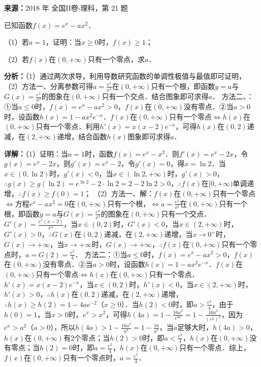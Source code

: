 \begin{question}[points=12]
\textbf{来源：}2018 年 全国II卷-理科，第 21 题\par
已知函数$f(x)=e^x-ax^2$．

（1）若$a=1$，证明：当$x\ge 0$时，$f(x)\ge 1$；

（2）若$f(x)$在$(0,+\infty)$只有一个零点，求$a$．
\begin{solution}

\textbf{分析：}（1）通过两次求导，利用导数研究函数的单调性极值与最值即可证明，
（2）方法一、分离参数可得$a=\frac{e^x}{x^2}$在$(0,+\infty)$只有一个根，即函数$y=a$与$G(x)=\frac{e^x}{x^2}$的图象在$(0,+\infty)$只有一个交点．结合图象即可求得$a$．
方法二、：①当$a\le 0$时，$f(x)=e^x-ax^2>0$，$f(x)$在$(0,+\infty)$没有零点．②当$a>0$时，设函数$h(x)=1-ax^2e^{-x}$．$f(x)$在$(0,+\infty)$只有一个零点$\Leftrightarrow h(x)$在$(0,+\infty)$只有一个零点．利用$h'(x)=x(x-2)e^{-x}$，可得$h(x)$在$(0,2)$递减，在$(2,+\infty)$递增，结合函数$h(x)$图象即可求得$a$．

\textbf{详解：}（1）证明：当$a=1$时，函数$f(x)=e^x-x^2$．则$f'(x)=e^x-2x$，令$g(x)=e^x-2x$，则$g'(x)=e^x-2$，令$g'(x)=0$，得$x=\ln2$．当$x\in(0,\ln2)$时，$g'(x)<0$，当$x\in(\ln2,+\infty)$时，$g'(x)>0$，$\therefore g(x)\ge g(\ln2)=e^{\ln2}-2\cdot\ln2=2-2\ln2>0$，$\therefore f(x)$在$[0,+\infty)$单调递增，$\therefore f(x)\ge f(0)=1$；
（2）方法一、解：$f(x)$在$(0,+\infty)$只有一个零点$\Leftrightarrow$方程$e^x-ax^2=0$在$(0,+\infty)$只有一个根，$\Leftrightarrow a=\frac{e^x}{x^2}$在$(0,+\infty)$只有一个根，即函数$y=a$与$G(x)=\frac{e^x}{x^2}$的图象在$(0,+\infty)$只有一个交点．$G'(x)=\frac{e^x(x-2)}{x^3}$，当$x\in(0,2)$时，$G'(x)<0$，当$x\in(2,+\infty)$时，$G'(x)>0$，$\therefore G(x)$在$(0,2)$递减，在$(2,+\infty)$递增，当$x\to0^+$时，$G(x)\to+\infty$，当$x\to+\infty$时，$G(x)\to+\infty$，$\therefore f(x)$在$(0,+\infty)$只有一个零点时，$a=G(2)=\frac{e^2}{4}$．
方法二：①当$a\le 0$时，$f(x)=e^x-ax^2>0$，$f(x)$在$(0,+\infty)$没有零点．②当$a>0$时，设函数$h(x)=1-ax^2e^{-x}$．$f(x)$在$(0,+\infty)$只有一个零点$\Leftrightarrow h(x)$在$(0,+\infty)$只有一个零点．$h'(x)=x(x-2)e^{-x}$，当$x\in(0,2)$时，$h'(x)<0$，当$x\in(2,+\infty)$时，$h'(x)>0$，$\therefore h(x)$在$(0,2)$递减，在$(2,+\infty)$递增，$\therefore h(x)\ge h(2)=1-4ae^{-2}$（$x\ge0$）．当$h(2)<0$时，即$a>\frac{e^2}{4}$，由于$h(0)=1$，当$x>0$时，$e^x>x^2$，可得$h(4a)=1-\frac{16a^3}{e^{4a}}=1-\frac{16a^3}{(e^a)^4}$，因为$e^a>a^2$（$a>0$），所以$h(4a)>1-\frac{16a^3}{a^8}=1-\frac{16}{a^5}$，当$a$足够大时，$h(4a)>0$，$h(x)$在$(0,+\infty)$有$2$个零点；当$h(2)>0$时，即$a<\frac{e^2}{4}$，$h(x)$在$(0,+\infty)$没有零点；当$h(2)=0$时，即$a=\frac{e^2}{4}$，$h(x)$在$(0,+\infty)$只有一个零点．综上，$f(x)$在$(0,+\infty)$只有一个零点时，$a=\frac{e^2}{4}$．
\end{solution}
\end{question}


